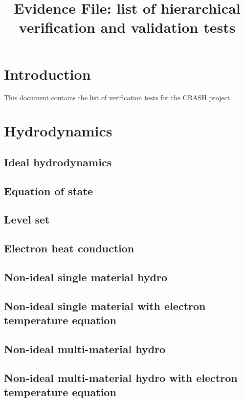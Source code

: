 \documentclass{article}
\title{Evidence File: list of hierarchical verification 
       and validation tests}
\begin{document}
\maketitle

\section{Introduction}

This document contains the list of verification tests for the CRASH project.

\section{Hydrodynamics}

   \subsection{Ideal hydrodynamics}
   
   \subsection{Equation of state}
   
   \subsection{Level set}

   \subsection{Electron heat conduction}

   \subsection{Non-ideal single material hydro}

   \subsection{Non-ideal single material with electron temperature equation}
   
   \subsection{Non-ideal multi-material hydro}

   \subsection{Non-ideal multi-material hydro with electron temperature equation}
   
\end{document}
